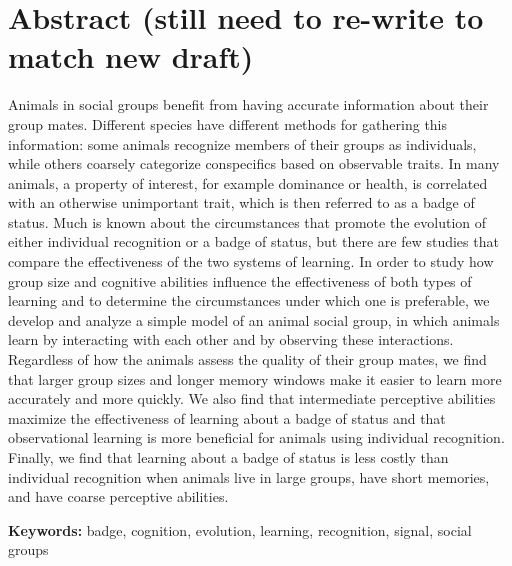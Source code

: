 \section*{Abstract (still need to re-write to match new draft)}
Animals in social groups benefit from having accurate information about their group mates. Different species have different methods for gathering this information: some animals recognize members of their groups as individuals, while others coarsely categorize conspecifics based on observable traits. In many animals, a property of interest, for example dominance or health, is correlated with an otherwise unimportant trait, which is then referred to as a badge of status. Much is known about the circumstances that promote the evolution of either individual recognition or a badge of status, but there are few studies that compare the effectiveness of the two systems of learning. In order to study how group size and cognitive abilities influence the effectiveness of both types of learning and to determine the circumstances under which one is preferable, we develop and analyze a simple model of an animal social group, in which animals learn by interacting with each other and by observing these interactions. Regardless of how the animals assess the quality of their group mates, we find that larger group sizes and longer memory windows make it easier to learn more accurately and more quickly. We also find that intermediate perceptive abilities maximize the effectiveness of learning about a badge of status and that observational learning is more beneficial for animals using individual recognition. Finally, we find that learning about a badge of status is less costly than individual recognition when animals live in large groups, have short memories, and have coarse perceptive abilities.



\textbf{Keywords:} badge, cognition, evolution, learning, recognition, signal, social groups

\newpage
